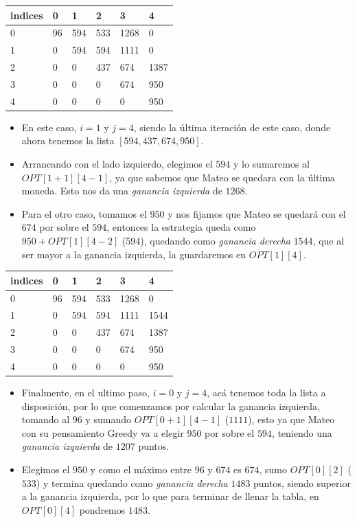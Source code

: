 \begin{table}[H]
    \centering
    \begin{tabular}{|l|l|l|l|l|l|}
    \hline
        indices & 0 & 1 & 2 & 3 & 4 \\ \hline
        0 & 96 & 594 & 533 & 1268 & 0 \\ \hline
        1 & 0 & 594 & 594 & 1111 & 0 \\ \hline
        2 & 0 & 0 & 437 & 674 & 1387 \\ \hline
        3 & 0 & 0 & 0 & 674 & 950 \\ \hline
        4 & 0 & 0 & 0 & 0 & 950 \\ \hline
    \end{tabular}
\end{table}
\begin{itemize}
    \item En este caso, $i = 1$ y $j = 4$, siendo la última iteración de este caso, donde ahora tenemos la lista $[594, 437, 674, 950]$.
    \item Arrancando con el lado izquierdo, elegimos el $594$ y lo sumaremos al $OPT[1+1][4-1]$, ya que sabemos que Mateo se quedara con la última moneda. Esto nos da una \textit{ganancia izquierda} de $1268$.
    \item Para el otro caso, tomamos el $950$ y nos fijamos que Mateo se quedará con el $674$ por sobre el $594$, entonces la estrategia queda como $950 + OPT[1][4-2]$ ($594$), quedando como \textit{ganancia derecha} $1544$, que al ser mayor a la ganancia izquierda, la guardaremos en $OPT[1][4]$.
\end{itemize}
\begin{table}[H]
    \centering
    \begin{tabular}{|l|l|l|l|l|l|}
    \hline
        indices & 0 & 1 & 2 & 3 & 4 \\ \hline
        0 & 96 & 594 & 533 & 1268 & 0 \\ \hline
        1 & 0 & 594 & 594 & 1111 & 1544 \\ \hline
        2 & 0 & 0 & 437 & 674 & 1387 \\ \hline
        3 & 0 & 0 & 0 & 674 & 950 \\ \hline
        4 & 0 & 0 & 0 & 0 & 950 \\ \hline
    \end{tabular}
\end{table}
\begin{itemize}
    \item Finalmente, en el ultimo paso, $i = 0$ y $j = 4$, acá tenemos toda la lista a disposición, por lo que comenzamos por calcular la ganancia izquierda, tomando al $96$ y sumando $OPT[0+1][4-1]$ ($1111$), esto ya que Mateo con su pensamiento Greedy va a elegir $950$ por sobre el $594$, teniendo una \textit{ganancia izquierda} de $1207$ puntos.
    \item Elegimos el $950$ y como el máximo entre $96$ y $674$ es $674$, sumo $OPT[0][2]$ ($533$) y termina quedando como \textit{ganancia derecha} $1483$ puntos, siendo superior a la ganancia izquierda, por lo que para terminar de llenar la tabla, en $OPT[0][4]$ pondremos $1483$.
\end{itemize}
